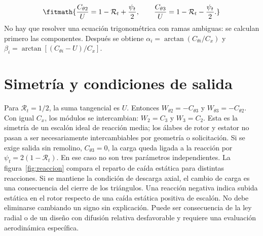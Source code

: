 \documentclass[10pt,openany]{book}
\begin{document}
\[
\fitmath{\frac{C_{\theta2}}U=1-\mathcal R_t+\frac{\psi_t}{2},\qquad
\frac{C_{\theta3}}U=1-\mathcal R_t-\frac{\psi_t}{2}.}
\]
No hay que resolver una ecuación trigonométrica con ramas ambiguas: se calculan primero las componentes. Después se obtiene \(\alpha_i=\arctan(C_{\theta i}/C_x)\) y \(\beta_i=\arctan[(C_{\theta i}-U)/C_x]\).

\section{Simetría y condiciones de salida}

Para \(\mathcal R_t=1/2\), la suma tangencial es \(U\). Entonces \(W_{\theta2}=-C_{\theta3}\) y \(W_{\theta3}=-C_{\theta2}\). Con igual \(C_x\), los módulos se intercambian: \(W_2=C_3\) y \(W_3=C_2\). Esta es la simetría de un escalón ideal de reacción media; los álabes de rotor y estator no pasan a ser necesariamente intercambiables por geometría o solicitación.
Si se exige salida sin remolino, \(C_{\theta3}=0\), la carga queda ligada a la reacción por \(\psi_t=2(1-\mathcal R_t)\). En ese caso no son tres parámetros independientes. La figura~\ref{fig:reaccion} compara el reparto de caída estática para distintas reacciones. Si se mantiene la condición de descarga axial, el cambio de carga es una consecuencia del cierre de los triángulos.
Una reacción negativa indica subida estática en el rotor respecto de una caída estática positiva de escalón. No debe eliminarse cambiando un signo sin explicación. Puede ser consecuencia de la ley radial o de un diseño con difusión relativa desfavorable y requiere una evaluación aerodinámica específica.
\end{document}
